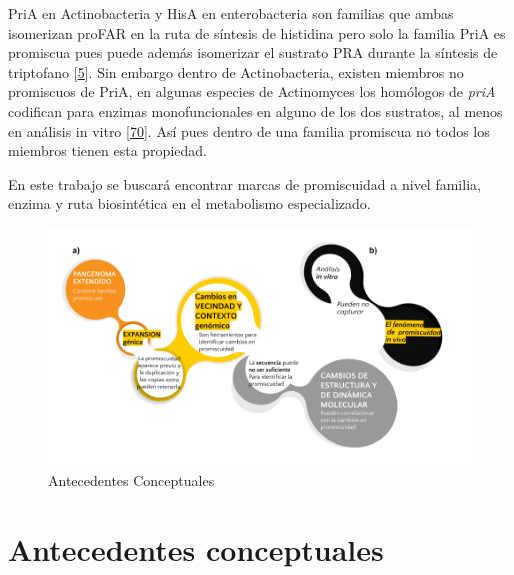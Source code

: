 \documentclass[12pt,twoside]{reedthesis}
\begin{document}
  PriA en Actinobacteria y HisA en enterobacteria son familias que ambas
  isomerizan proFAR en la ruta de síntesis de histidina pero solo la
  familia PriA es promiscua pues puede además isomerizar el sustrato PRA
  durante la síntesis de triptofano
  {[}\protect\hyperlink{ref-baronagomez_occurrence_2003}{5}{]}. Sin
  embargo dentro de Actinobacteria, existen miembros no promiscuos de
  PriA, en algunas especies de Actinomyces los homólogos de \emph{priA}
  codifican para enzimas monofuncionales en alguno de los dos sustratos,
  al menos en análisis in vitro
  {[}\protect\hyperlink{ref-juarez-vazquez_evolution_2017}{70}{]}. Así
  pues dentro de una familia promiscua no todos los miembros tienen esta
  propiedad.
  
  En este trabajo se buscará encontrar marcas de promiscuidad a nivel
  familia, enzima y ruta biosintética en el metabolismo especializado.
  
  \begin{figure}[h!tbp]
  \centering
  \includegraphics[angle = 0,scale = 0.9]{chapter0/AntecedentesConceptuales.png}
  \caption[Antecedentes Conceptuales]{\normalsize{Antecedentes Conceptuales}}
  \label{fig:Antecedentes conceptuales de promiscuidad}
  \end{figure}
  
  \nocite{@carbonell_molecular_2010,@juarez-vazquez_evolution_2017,@noda_tesis_2012,@soskine_mutational_2010,@aharoni_evolvability_2005,@bloom_neutral_2007,@zhao__function_prediction_neighbourhood_2014,@juarez-vazquez_evolution_2017,@martinez-nunez_lifestyle_2015,@zou_evolution_2015, @gatti-lafranconi_flexibility_2013}
  
  \section{Antecedentes conceptuales}\label{antecedentes-conceptuales}
  
\end{document}
